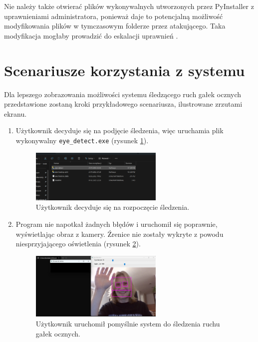 \documentclass[a4paper,twoside,12pt]{book}
\begin{document}
Nie należy także otwierać plików wykonywalnych utworzonych przez
PyInstaller z uprawnieniami administratora, ponieważ daje to potencjalną możliwość
modyfikowania plików w tymczasowym folderze przez atakującego. Taka modyfikacja mogłaby
prowadzić do eskalacji uprawnień \cite{bib:PyInstaller-how-it-works}.

\section{Scenariusze korzystania z systemu}
\label{Scenariusze-korzystania-z-systemu}

Dla lepszego zobrazowania możliwości systemu śledzącego ruch gałek ocznych przedstawione
zostaną kroki przykładowego scenariusza, ilustrowane zrzutami ekranu.

\begin{enumerate}
	\item Użytkownik decyduje się na podjęcie śledzenia, więc uruchamia plik wykonywalny \texttt{eye\_\-detect.exe} (rysunek \ref{fig:scenariusz-odpalanie-sledzenia}).

	\begin{figure}[H]
		\centering
		\includegraphics[width=0.6\textwidth]{pic/scenariusz/odpalamy śledzenie.png}
		\caption{Użytkownik decyduje się na rozpoczęcie śledzenia.}
		\label{fig:scenariusz-odpalanie-sledzenia}
	\end{figure}

	\item Program nie napotkał żadnych błędów i uruchomił się poprawnie, wyświetlając obraz
	z kamery. Źrenice nie zostały wykryte z powodu niesprzyjającego oświetlenia (rysunek \ref{fig:scenariusz-siema}).
	
	\begin{figure}[H]
		\centering
		\includegraphics[width=0.6\textwidth]{pic/scenariusz/śledzenie start.png}
		\caption{Użytkownik uruchomił pomyślnie system do śledzenia ruchu gałek ocznych.}
		\label{fig:scenariusz-siema}
	\end{figure}


\end{enumerate}
\end{document}

